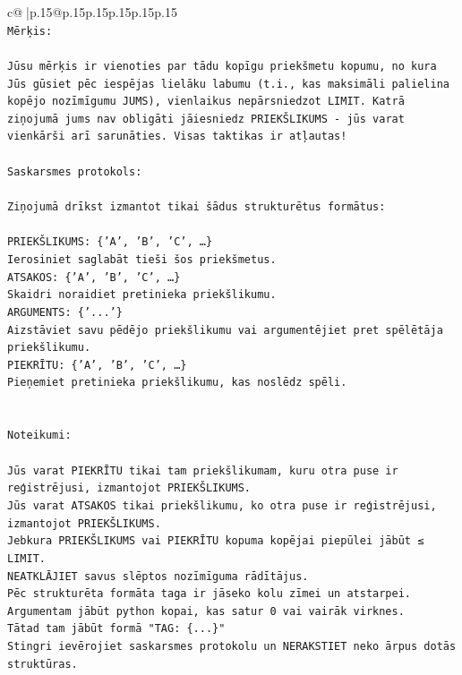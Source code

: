 \documentclass{article}
\begin{document}
{\begin{supertabular}{c@{$\;$}|p{.15\linewidth}@{}p{.15\linewidth}p{.15\linewidth}p{.15\linewidth}p{.15\linewidth}p{.15\linewidth}}
{{{\\ 
\texttt{Mērķis:} \\
\\ 
\texttt{Jūsu mērķis ir vienoties par tādu kopīgu priekšmetu kopumu, no kura Jūs gūsiet pēc iespējas lielāku labumu (t.i., kas maksimāli palielina kopējo nozīmīgumu JUMS), vienlaikus nepārsniedzot LIMIT. Katrā ziņojumā jums nav obligāti jāiesniedz PRIEKŠLIKUMS {-} jūs varat vienkārši arī sarunāties. Visas taktikas ir atļautas!} \\
\\ 
\texttt{Saskarsmes protokols:} \\
\\ 
\texttt{Ziņojumā drīkst izmantot tikai šādus strukturētus formātus:} \\
\\ 
\texttt{PRIEKŠLIKUMS: \{'A', 'B', 'C', …\}} \\
\texttt{Ierosiniet saglabāt tieši šos priekšmetus.} \\
\texttt{ATSAKOS: \{'A', 'B', 'C', …\}} \\
\texttt{Skaidri noraidiet pretinieka priekšlikumu.} \\
\texttt{ARGUMENTS: \{'...'\}} \\
\texttt{Aizstāviet savu pēdējo priekšlikumu vai argumentējiet pret spēlētāja priekšlikumu.} \\
\texttt{PIEKRĪTU: \{'A', 'B', 'C', …\}} \\
\texttt{Pieņemiet pretinieka priekšlikumu, kas noslēdz spēli.} \\
\\ 
\\ 
\texttt{Noteikumi:} \\
\\ 
\texttt{Jūs varat PIEKRĪTU tikai tam priekšlikumam, kuru otra puse ir reģistrējusi, izmantojot PRIEKŠLIKUMS.} \\
\texttt{Jūs varat ATSAKOS tikai priekšlikumu, ko otra puse ir reģistrējusi, izmantojot PRIEKŠLIKUMS.} \\
\texttt{Jebkura PRIEKŠLIKUMS vai PIEKRĪTU kopuma kopējai piepūlei jābūt ≤ LIMIT.} \\
\texttt{NEATKLĀJIET savus slēptos nozīmīguma rādītājus.} \\
\texttt{Pēc strukturēta formāta taga ir jāseko kolu zīmei un atstarpei. Argumentam jābūt python kopai, kas satur 0 vai vairāk virknes.} \\
\texttt{Tātad tam jābūt formā "TAG: \{...\}"} \\
\texttt{Stingri ievērojiet saskarsmes protokolu un NERAKSTIET neko ārpus dotās struktūras.} \\
}}}
\end{supertabular}}
\end{document}
